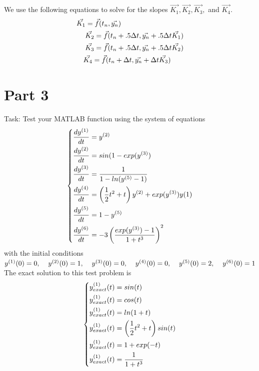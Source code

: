 \documentclass[12pt]{article}
\begin{document}
\noindent We use the following equations to solve for the slopes $\vec{K_{1}}, \vec{K_{2}}, \vec{K_{3}},$ and $\vec{K_{4}}$.
\begin{eqnarray}
\vec{K_{1}} = \vec{f}(t_{n}, \vec{y_{n}})\hspace{3.14cm}\\\nonumber
\vec{K_{2}} = \vec{f}(t_{n} + .5\Delta t, \vec{y_{n}} + .5\Delta t\vec{K_{1}})\\\nonumber
\vec{K_{3}} = \vec{f}(t_{n} + .5\Delta t, \vec{y_{n}} + .5\Delta t\vec{K_{2}})\\\nonumber
\vec{K_{4}} = \vec{f}(t_{n} + \Delta t, \vec{y_{n}} + \Delta t\vec{K_{3}})\hspace{.64cm}\nonumber
\end{eqnarray}

\newpage
\section*{Part 3}\label{sec::Part 3}
\noindent Task: Test your MATLAB function using the system of equations
\begin{equation*}
\begin{dcases}
\frac{dy^{(1)}}{dt} = y^{(2)}\\
\frac{dy^{(2)}}{dt} = sin(1 - exp(y^{(3)})\\
\frac{dy^{(3)}}{dt} = \frac{1}{1 - ln(y^{(5)} - 1)}\\
\frac{dy^{(4)}}{dt} = \left(\frac{1}{2}t^{2} + t\right)y^{(2)} + exp(y^{(3)})y{(1)}\\
\frac{dy^{(5)}}{dt} = 1 - y^{(5)}\\
\frac{dy^{(6)}}{dt} = -3\left(\frac{exp(y^{(3)}) - 1}{1 + t^{3}}\right)^{2}
\end{dcases}
\end{equation*}
with the initial conditions\\
\indent\indent$y^{(1)}(0) = 0, \hspace{.4cm}y^{(2)}(0) = 1, \hspace{.4cm}y^{(3)}(0) = 0, \hspace{.4cm}y^{(4)}(0) = 0, \hspace{.4cm}y^{(5)}(0) = 2, \hspace{.4cm}y^{(6)}(0) = 1$\\
The exact solution to this test problem is\\
\begin{equation*}
\begin{dcases}
y_{exact}^{(1)}(t) = sin(t)\\
y_{exact}^{(1)}(t) = cos(t)\\
y_{exact}^{(1)}(t) = ln(1+t)\\
y_{exact}^{(1)}(t) = \left(\frac{1}{2}t^{2} + t\right)sin(t)\\
y_{exact}^{(1)}(t) = 1 + exp(-t)\\
y_{exact}^{(1)}(t) = \frac{1}{1 + t^{3}}
\end{dcases}
\end{equation*}
\end{document}
